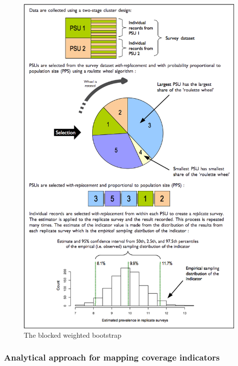 \documentclass[12pt,a4paper]{article}
\begin{document}
\begin{figure}[H]

{\centering \includegraphics[width=9.76in]{figures/bbw} 

}

\caption{The blocked weighted bootstrap}\label{fig:indicators31}
\end{figure}

\hypertarget{analytical-approach-for-mapping-coverage-indicators}{%
\subsubsection{Analytical approach for mapping coverage indicators}\label{analytical-approach-for-mapping-coverage-indicators}}
\end{document}
